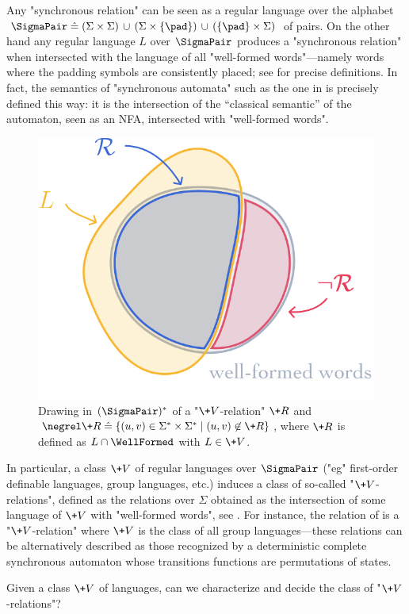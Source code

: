 Any "synchronous relation" can be seen as a regular language over the alphabet
$\SigmaPair \defeq (\Sigma \times \Sigma) \,\cup\,
(\Sigma \times \{\pad\}) \,\cup\, (\{\pad\} \times \Sigma)$ of pairs. On the other hand any regular language $L$ over $\SigmaPair$
produces a "synchronous relation" when intersected with the language of all
"well-formed words"---namely words where the padding symbols are consistently placed;
see  for precise definitions. In fact, the semantics
of "synchronous automata" such as the one in  is precisely defined this way:
it is the intersection of the ``classical semantic'' of the automaton, seen as an NFA, intersected
with "well-formed words".

\begin{figure}[htbp]
	\begin{center}
		\includegraphics[width=.4\linewidth]{fig/algebra/projection.png}
	\end{center}
	\caption{
		\AP\label{fig:projection}
		Drawing in $(\SigmaPair)^*$ of a "$\+V$-relation" $\+R$ and $\negrel\+R \defeq \{(u,v) \in \Sigma^*\times \Sigma^* \mid (u,v) \not\in \+R\}$, where $\+R$ is defined as $L \cap \WellFormed$ with $L \in \+V$.
	} 
\end{figure}

In particular, a class $\+V$ of regular languages over
$\SigmaPair$
("eg" first-order definable languages, group languages, etc.) induces a class of so-called
"$\+V$-relations", defined as the relations over $\Sigma$ obtained as the intersection of some 
language of $\+V$ with "well-formed words", see .
For instance, the relation of 
is a "$\+V$-relation" where $\+V$ is the class of all group languages---these relations can be 
alternatively described as those recognized by a deterministic complete synchronous automaton whose 
transitions functions are permutations of states.

\begin{question}
	\AP\label{quest:V-relations}
	Given a class $\+V$ of languages, can we characterize and decide the class of "$\+V$-relations"?
\end{question}

